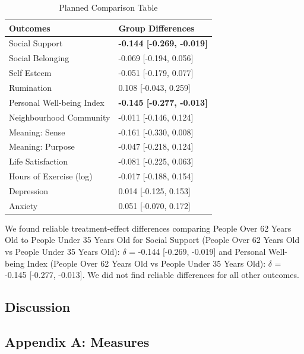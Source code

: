 \documentclass[
  single column]{article}
\begin{document}
\begin{longtable}[]{@{}ll@{}}

\caption{\label{tbl-planned-comparison}Planned Comparison Table}

\tabularnewline

\toprule\noalign{}
Outcomes & Group Differences \\
\midrule\noalign{}
\endhead
\bottomrule\noalign{}
\endlastfoot
Social Support & \textbf{-0.144 {[}-0.269, -0.019{]}} \\
Social Belonging & -0.069 {[}-0.194, 0.056{]} \\
Self Esteem & -0.051 {[}-0.179, 0.077{]} \\
Rumination & 0.108 {[}-0.043, 0.259{]} \\
Personal Well-being Index & \textbf{-0.145 {[}-0.277, -0.013{]}} \\
Neighbourhood Community & -0.011 {[}-0.146, 0.124{]} \\
Meaning: Sense & -0.161 {[}-0.330, 0.008{]} \\
Meaning: Purpose & -0.047 {[}-0.218, 0.124{]} \\
Life Satisfaction & -0.081 {[}-0.225, 0.063{]} \\
Hours of Exercise (log) & -0.017 {[}-0.188, 0.154{]} \\
Depression & 0.014 {[}-0.125, 0.153{]} \\
Anxiety & 0.051 {[}-0.070, 0.172{]} \\

\end{longtable}

We found reliable treatment-effect differences comparing People Over 62
Years Old to People Under 35 Years Old for Social Support (People Over
62 Years Old vs People Under 35 Years Old): \(\delta\) = -0.144
{[}-0.269, -0.019{]} and Personal Well-being Index (People Over 62 Years
Old vs People Under 35 Years Old): \(\delta\) = -0.145 {[}-0.277,
-0.013{]}. We did not find reliable differences for all other outcomes.

\newpage{}

\subsection{Discussion}\label{discussion}

\newpage{}

\subsection{Appendix A: Measures}\label{appendix-measures}
\end{document}
